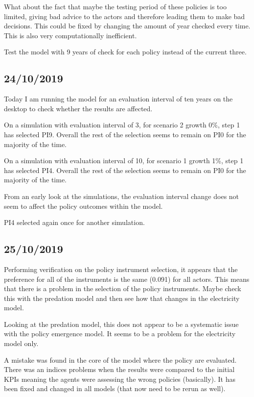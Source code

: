 What about the fact that maybe the testing period of these policies is too limited, giving bad advice to the actors and therefore leading them to make bad decisions. This could be fixed by changing the amount of year checked every time. This is also very computationally inefficient.

Test the model with 9 years of check for each policy instead of the current three.

\subsection{24/10/2019}

Today I am running the model for an evaluation interval of ten years on the desktop to check whether the results are affected.

On a simulation with evaluation interval of 3, for scenario 2 growth 0\%, step 1 has selected PI9. Overall the rest of the selection seems to remain on PI0 for the majority of the time.

On a simulation with evaluation interval of 10, for scenario 1 growth 1\%, step 1 has selected PI4. Overall the rest of the selection seems to remain on PI0 for the majority of the time.

From an early look at the simulations, the evaluation interval change does not seem to affect the policy outcomes within the model.

PI4 selected again once for another simulation.

\subsection{25/10/2019}

Performing verification on the policy instrument selection, it appears that the preference for all of the instruments is the same (0.091) for all actors. This means that there is a problem in the selection of the policy instruments. Maybe check this with the predation model and then see how that changes in the electricity model.

Looking at the predation model, this does not appear to be a systematic issue with the policy emergence model. It seems to be a problem for the electricity model only.

A mistake was found in the core of the model where the policy are evaluated. There was an indices problems when the results were compared to the initial KPIs meaning the agents were assessing the wrong policies (basically). It has been fixed and changed in all models (that now need to be rerun as well).

